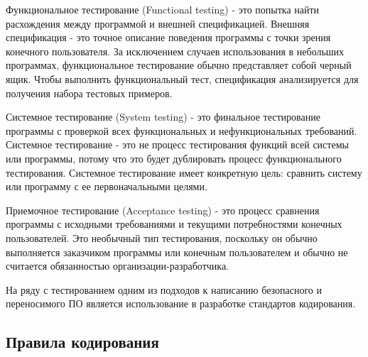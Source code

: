 Функциональное тестирование (Functional testing) - это попытка найти расхождения между 
программой и внешней спецификацией. Внешняя спецификация - это точное описание поведения 
программы с точки зрения конечного пользователя. За исключением случаев использования в 
небольших программах, функциональное тестирование обычно представляет собой черный ящик.
Чтобы выполнить функциональный тест, спецификация анализируется для получения набора тестовых 
примеров.

Системное тестирование (System testing) - это финальное тестирование программы с проверкой всех функциональных и 
нефункциональных требований. Системное тестирование - это не процесс тестирования функций всей системы или 
программы, потому что это будет дублировать процесс функционального тестирования. Системное 
тестирование имеет конкретную цель: сравнить систему или программу с ее первоначальными 
целями.

Приемочное тестирование (Acceptance testing) - это процесс сравнения программы с исходными требованиями 
и текущими потребностями конечных пользователей. Это необычный тип тестирования, поскольку он обычно 
выполняется заказчиком программы или конечным пользователем и обычно не считается обязанностью 
организации-разработчика.

На ряду с тестированием одним из подходов к написанию безопасного и переносимого ПО 
является использование в разработке стандартов кодирования. 

\subsection{Правила кодирования}

